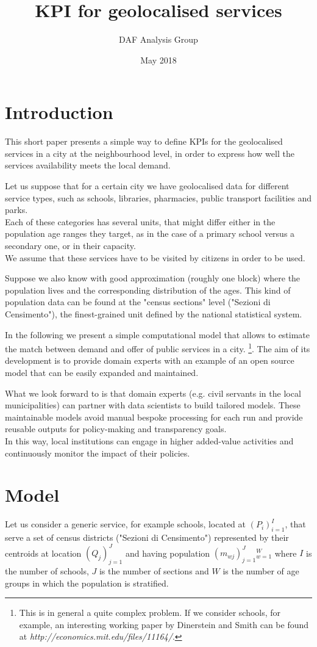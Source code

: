 \documentclass{article}
\title{KPI for geolocalised services}
\author{DAF Analysis Group}
\date{May 2018}
\begin{document}
\maketitle
\section{Introduction}
This short paper presents a simple way to define KPIs for the geolocalised services in a city at the neighbourhood level, in order to express how well the services availability meets the local demand.

Let us suppose that for a certain city we have geolocalised data for different service types, such as schools, libraries, pharmacies, public transport facilities and parks.\\
Each of these categories has several units, that might differ either in the population age ranges they target, as in the case of a primary school versus a secondary one, or in their capacity. \\
We assume that these services have to be visited by citizens in order to be used. 

Suppose we also know with good approximation (roughly one block) where the population lives and the corresponding distribution of the ages. This kind of population data can be found at the "census sections" level ("Sezioni di Censimento"), the finest-grained unit defined by the national statistical system.

In the following we present a simple computational model that allows to estimate the match between demand and offer of public services in a city. \footnote{This is in general a quite complex problem. If we consider schools, for example, an interesting working paper by Dinerstein and Smith can be found at \textit{http://economics.mit.edu/files/11164/}.}.
The aim of its development is to provide domain experts with an example of an open source model that can be easily expanded and maintained.

What we look forward to is that domain experts (e.g. civil servants in the local municipalities) can partner with data scientists to build tailored models. These maintainable models avoid manual bespoke processing for each run and provide reusable outputs for policy-making and transparency goals. \\
In this way, local institutions can engage in higher added-value activities and continuously monitor the impact of their policies.

\newpage
\section{Model}
Let us consider a generic service, for example schools, located at $(P_i)_{i=1}^I$, that serve a set of census districts ("Sezioni di Censimento") represented by their centroids at location $(Q_j)_{j=1}^{J}$ and having population $(m_{wj})_{j=1}^{J}{}_{w=1}^{W}$ where $I$ is the  number of schools, $J$ is the number of sections and $W$ is the number of age groups in which the population is stratified.
\end{document}
